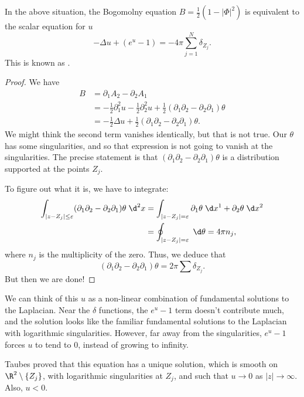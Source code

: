\documentclass[a4paper]{article}
\begin{document}
\begin{thm}
  In the above situation, the Bogomolny equation $B = \frac{1}{2} (1 - |\Phi|^2)$ is equivalent to the scalar equation for $u$
  \[
    -\Delta u + (e^u - 1) = -4\pi \sum_{j = 1}^N \delta_{Z_j}.
  \]
  This is known as .
\end{thm}

\begin{proof}
  We have
  \begin{align*}
    B &= \partial_1 A_2 - \partial_2 A_1 \\
    &= -\frac{1}{2} \partial_1^2 u - \frac{1}{2} \partial_2^2 u + \frac{1}{2} (\partial_1 \partial_2 - \partial_2 \partial_1) \theta\\
    &= - \frac{1}{2} \Delta u + \frac{1}{2} (\partial_1 \partial_2 - \partial_2 \partial_1) \theta.
  \end{align*}
  We might think the second term vanishes identically, but that is not true. Our $\theta$ has some singularities, and so that expression is not going to vanish at the singularities. The precise statement is that $(\partial_1 \partial_2 - \partial_2 \partial_1) \theta$ is a distribution supported at the points $Z_j$.

  To figure out what it is, we have to integrate:
  \begin{align*}
    \int_{|z - Z_j| \leq \varepsilon} (\partial_1 \partial_2 - \partial_2 \partial_1) \theta \;\d^2 x &= \int_{|z - Z_j| = \varepsilon} \partial_1 \theta \;\d x^1 + \partial_2 \theta \;\d x^2 \\
    &= \oint_{|z - Z_j| = \varepsilon} \;\d \theta = 4\pi n_j,
  \end{align*}
  where $n_j$ is the multiplicity of the zero. Thus, we deduce that
  \[
    (\partial_1 \partial_2 - \partial_2 \partial_1) \theta = 2\pi \sum \delta_{Z_j}.
  \]
  But then we are done!
\end{proof}
We can think of this $u$ as a non-linear combination of fundamental solutions to the Laplacian. Near the $\delta$ functions, the $e^u - 1$ term doesn't contribute much, and the solution looks like the familiar fundamental solutions to the Laplacian with logarithmic singularities. However, far away from the singularities, $e^u - 1$ forces $u$ to tend to $0$, instead of growing to infinity.

Taubes proved that this equation has a unique solution, which is smooth on $\R^2 \setminus \{Z_j\}$, with logarithmic singularities at $Z_j$, and such that $u \to 0$ as $|z| \to \infty$. Also, $u < 0$.
\end{document}
